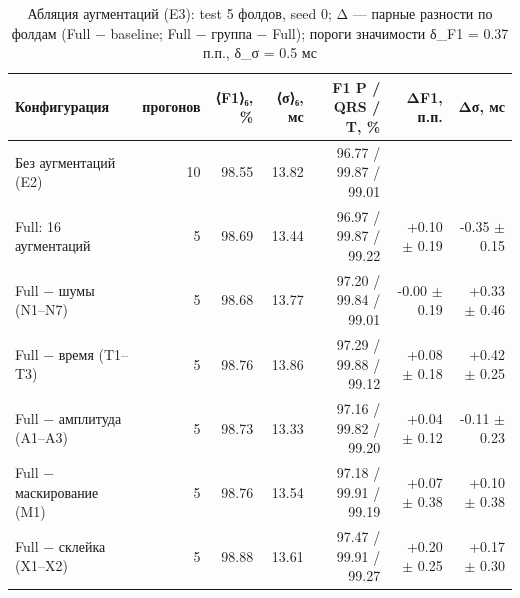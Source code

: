 \begin{table}[t]
\centering
\small
\caption{Абляция аугментаций (E3): test 5 фолдов, seed 0; Δ — парные разности по фолдам (Full − baseline; Full − группа − Full); пороги значимости δ_F1 = 0.37 п.п., δ_σ = 0.5 мс}
\label{tab:ablation}
\begin{tabular}{lrrrrrr}
\toprule
Конфигурация & прогонов & ⟨F1⟩₆, \% & ⟨σ⟩₆, мс & F1 P / QRS / T, \% & ΔF1, п.п. & Δσ, мс \\
\midrule
Без аугментаций (E2) & 10 & 98.55 & 13.82 & 96.77 / 99.87 / 99.01 &  &  \\
Full: 16 аугментаций & 5 & 98.69 & 13.44 & 96.97 / 99.87 / 99.22 & +0.10 $\pm$ 0.19 & -0.35 $\pm$ 0.15 \\
Full − шумы (N1–N7) & 5 & 98.68 & 13.77 & 97.20 / 99.84 / 99.01 & -0.00 $\pm$ 0.19 & +0.33 $\pm$ 0.46 \\
Full − время (T1–T3) & 5 & 98.76 & 13.86 & 97.29 / 99.88 / 99.12 & +0.08 $\pm$ 0.18 & +0.42 $\pm$ 0.25 \\
Full − амплитуда (A1–A3) & 5 & 98.73 & 13.33 & 97.16 / 99.82 / 99.20 & +0.04 $\pm$ 0.12 & -0.11 $\pm$ 0.23 \\
Full − маскирование (M1) & 5 & 98.76 & 13.54 & 97.18 / 99.91 / 99.19 & +0.07 $\pm$ 0.38 & +0.10 $\pm$ 0.38 \\
Full − склейка (X1–X2) & 5 & 98.88 & 13.61 & 97.47 / 99.91 / 99.27 & +0.20 $\pm$ 0.25 & +0.17 $\pm$ 0.30 \\
\bottomrule
\end{tabular}
\end{table}
